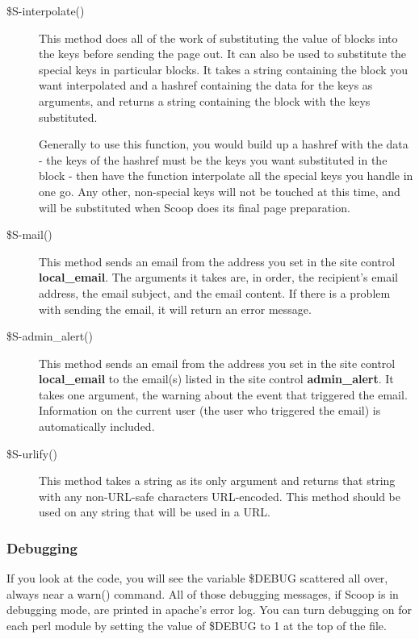 \begin{description}
\item[\$S-\latexhtml{$>$}{>}interpolate()] This method does all of the work of substituting the value of blocks into the keys before sending the page out. It can also be used to substitute the special keys in particular blocks. It takes a string containing the block you want interpolated and a hashref containing the data for the keys as arguments, and returns a string containing the block with the keys substituted.

Generally to use this function, you would build up a hashref with the data - the keys of the hashref must be the keys you want substituted in the block - then have the function interpolate all the special keys you handle in one go. Any other, non-special keys will not be touched at this time, and will be substituted when Scoop does its final page preparation.

\item[\$S-\latexhtml{$>$}{>}mail()] This method sends an email from the address you set in the site control {\bf local\_email}. The arguments it takes are, in order, the recipient's email address, the email subject, and the email content. If there is a problem with sending the email, it will return an error message.

\item[\$S-\latexhtml{$>$}{>}admin\_alert()] This method sends an email from the address you set in the site control {\bf local\_email} to the email(s) listed in the site control {\bf admin\_alert}. It takes one argument, the warning about the event that triggered the email. Information on the current user (the user who triggered the email) is automatically included.

\item[\$S-\latexhtml{$>$}{>}urlify()] This method takes a string as its only argument and returns that string with any non-URL-safe characters URL-encoded. This method should be used on any string that will be used in a URL.

\end{description}

\subsubsection{Debugging}

If you look at the code, you will see the variable \$DEBUG scattered all over, always near a warn() command. All of those debugging messages, if Scoop is in debugging mode, are printed in apache's error log. You can turn debugging on for each perl module by setting the value of \$DEBUG to 1 at the top of the file.


